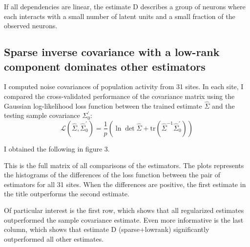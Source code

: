 If all dependencies are linear, the estimate D describes a group of neurons where each interacts with a small number of latent units and a small fraction of the observed neurons. 

\subsection*{Sparse inverse covariance with a low-rank component dominates other estimators}
I computed noise covariances of population activity from 31 sites.  In each site, I compared the cross-validated performance of the covariance matrix using the Gaussian log-likelihood loss function between the trained estimate $ \hat\Sigma$ and the testing sample covariance $ \Sigma_0^\prime$:
\begin{equation}
\mathcal L(\hat\Sigma,\hat\Sigma_0^\prime) = 
\frac 1 p\left( \ln \det \hat \Sigma + \mbox{tr}(\hat \Sigma^{-1}\hat\Sigma_0^\prime) \right) 
\end{equation}

I obtained the following in figure 3.

This is the full matrix of all comparisons of the estimators.  The plots represents the histograms of the differences of the loss function between the pair of estimators for all 31 sites.  When the differences are positive, the first estimate in the title outperforms the second estimate.

Of particular interest is the first row, which shows that all regularized estimates  outperformed the sample covariance estimate.  Even more informative is the last column, which shows that estimate D (sparse+lowrank) significantly outperformed all other estimates.



